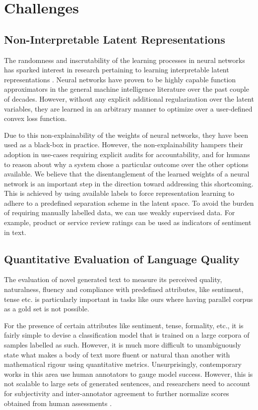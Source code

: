 \section{Challenges}

\subsection{Non-Interpretable Latent Representations}

The randomness and inscrutability of the learning processes in neural networks has sparked interest in research pertaining to learning interpretable latent representations \citep{chen2016infogan}. Neural networks have proven to be highly capable function approximators in the general machine intelligence literature over the past couple of decades. However, without any explicit additional regularization over the latent variables, they are learned in an arbitrary manner to optimize over a user-defined convex loss function.

Due to this non-explainability of the weights of neural networks, they have been used as a black-box in practice. However, the non-explainability hampers their adoption in use-cases requiring explicit audits for accountability, and for humans to reason about why a system chose a particular outcome over the other options available. We believe that the disentanglement of the learned weights of a neural network is an important step in the direction toward addressing this shortcoming. This is achieved by using available labels to force representation learning to adhere to a predefined separation scheme in the latent space. To avoid the burden of requiring manually labelled data, we can use weakly supervised data. For example, product or service review ratings can be used as indicators of sentiment in text.

\subsection{Quantitative Evaluation of Language Quality}

The evaluation of novel generated text to measure its perceived quality, naturalness, fluency and compliance with predefined attributes, like sentiment, tense etc. is particularly important in tasks like ours where having parallel corpus as a gold set is not possible.

For the presence of certain attributes like sentiment, tense, formality, etc., it is fairly simple to devise a classification model that is trained on a large corpora of samples labelled as such. However, it is much more difficult to unambiguously state what makes a body of text more fluent or natural than another with mathematical rigour using quantitative metrics. Unsurprisingly, contemporary works in this area use human annotators \citep{hu2017toward,shen2017style,fu2017style} to gauge model success. However, this is not scalable to large sets of generated sentences, and researchers need to account for subjectivity and inter-annotator agreement to further normalize scores obtained from human assessments \citep{bermingham2009study,nowak2010reliable}.

